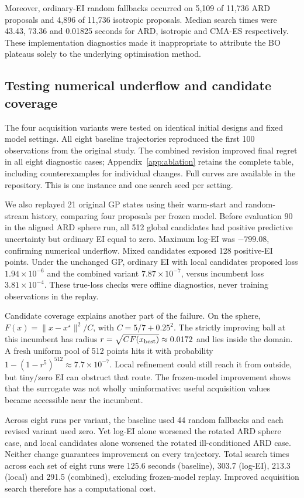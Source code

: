 \documentclass[12pt]{article}
\begin{document}
Moreover, ordinary-EI random fallbacks occurred on 5,109 of 11,736 ARD
proposals and 4,896 of 11,736 isotropic proposals. Median search times were
43.43, 73.36 and 0.01825 seconds for ARD, isotropic and CMA-ES respectively.
These implementation diagnostics made it inappropriate to attribute the BO
plateaus solely to the underlying optimisation method.

\subsection{Testing numerical underflow and candidate coverage}
The four acquisition variants were tested on identical initial designs and
fixed model settings. All eight baseline trajectories reproduced the first
100 observations from the original study. The combined revision improved
final regret in all eight diagnostic cases; Appendix~\ref{app:ablation}
retains the complete table, including counterexamples for individual
changes. Full curves are available in the repository. This is one instance and one search seed per setting.

We also replayed 21 original GP states using their warm-start and random-stream
history, comparing four proposals per frozen model. Before evaluation 90 in
the aligned ARD sphere run, all 512 global candidates had positive predictive
uncertainty but ordinary EI equal to zero. Maximum log-EI was $-799.08$,
confirming numerical underflow. Mixed candidates exposed 128 positive-EI
points. Under the unchanged GP, ordinary EI with local candidates proposed
loss $1.94\times10^{-6}$ and the combined variant $7.87\times10^{-7}$,
versus incumbent loss $3.81\times10^{-4}$. These true-loss checks were offline
diagnostics, never training observations in the replay.

Candidate coverage explains another part of the failure. On the sphere,
$F(x)=\|x-x^\star\|^2/C$, with $C=5/7+0.25^2$. The strictly improving ball
at this incumbent has radius $r=\sqrt{CF(x_{\rm best})}\approx0.0172$ and
lies inside the domain. A fresh uniform pool of 512 points hits it with
probability $1-(1-r^5)^{512}\approx7.7\times10^{-7}$. Local refinement could
still reach it from outside, but tiny/zero EI can obstruct that route.
The frozen-model improvement shows that the surrogate was not wholly
uninformative: useful acquisition values became accessible near the incumbent.

Across eight runs per variant, the baseline used 44 random fallbacks and
each revised variant used zero. Yet log-EI alone worsened the rotated ARD
sphere case, and local candidates alone worsened the rotated ill-conditioned
ARD case. Neither change guarantees improvement on every trajectory. Total
search times across each set of eight runs were 125.6 seconds (baseline),
303.7 (log-EI), 213.3 (local) and 291.5 (combined), excluding frozen-model replay.
Improved acquisition search therefore has a computational cost.
\end{document}
